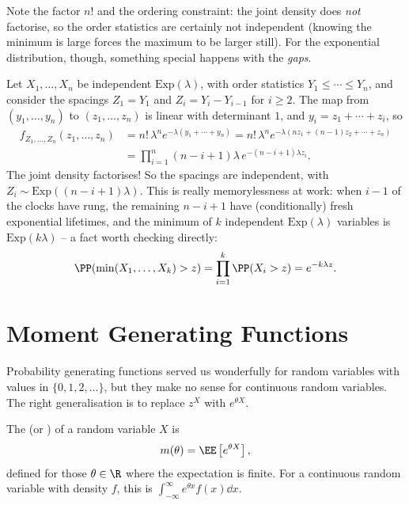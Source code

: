 Note the factor $n!$ and the ordering constraint: the joint density does \emph{not} factorise, so the order statistics are certainly not independent (knowing the minimum is large forces the maximum to be larger still). For the exponential distribution, though, something special happens with the \emph{gaps}.

\begin{example}
	Let $X_1, \dots, X_n$ be independent $\mathrm{Exp}(\lambda)$, with order statistics $Y_1 \leq \cdots \leq Y_n$, and consider the spacings $Z_1 = Y_1$ and $Z_i = Y_i - Y_{i - 1}$ for $i \geq 2$. The map from $(y_1, \dots, y_n)$ to $(z_1, \dots, z_n)$ is linear with determinant $1$, and $y_i = z_1 + \cdots + z_i$, so
	\begin{align*}
		f_{Z_1, \dots, Z_n}(z_1, \dots, z_n) &= n!\, \lambda^n e^{-\lambda(y_1 + \cdots + y_n)} = n!\,\lambda^n e^{-\lambda(nz_1 + (n-1)z_2 + \cdots + z_n)} \\
		&= \prod_{i = 1}^{n} (n - i + 1)\lambda \, e^{-(n - i + 1)\lambda z_i}.
	\end{align*}
	The joint density factorises! So the spacings are independent, with $Z_i \sim \mathrm{Exp}((n - i + 1)\lambda)$. This is really memorylessness at work: when $i - 1$ of the clocks have rung, the remaining $n - i + 1$ have (conditionally) fresh exponential lifetimes, and the minimum of $k$ independent $\mathrm{Exp}(\lambda)$ variables is $\mathrm{Exp}(k\lambda)$ -- a fact worth checking directly:
	$$
	\PP(\min(X_1, \dots, X_k) > z) = \prod_{i=1}^k \PP(X_i > z) = e^{-k\lambda z}.
	$$
\end{example}


\section{Moment Generating Functions}

Probability generating functions served us wonderfully for random variables with values in $\{0, 1, 2, \dots\}$, but they make no sense for continuous random variables. The right generalisation is to replace $z^X$ with $e^{\theta X}$.

\begin{definition}
	The  (or ) of a random variable $X$ is
	$$
	m(\theta) = \EE\left[e^{\theta X}\right],
	$$
	defined for those $\theta \in \R$ where the expectation is finite. For a continuous random variable with density $f$, this is $\int_{-\infty}^{\infty} e^{\theta x}f(x)\dd x$.
\end{definition}


